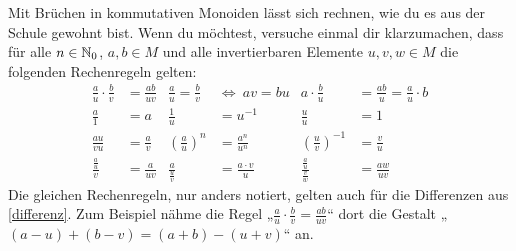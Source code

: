\begin{bem}
    Mit Brüchen in kommutativen Monoiden lässt sich rechnen, wie du es aus der Schule gewohnt bist. Wenn du möchtest, versuche einmal dir klarzumachen, dass für alle $n\in \mathbb N_0$, $a,b\in M$ und alle invertierbaren Elemente $u,v,w\in M$ die folgenden Rechenregeln gelten:
    \begingroup
    \allowdisplaybreaks
    \begin{align*}
    \frac{a}{u}\cdot \frac{b}{v} & = \frac{ab}{uv} & \frac{a}{u}=\frac{b}{v}\ & \Leftrightarrow\ av=bu & a\cdot \frac{b}{u} & = \frac{ab}{u} = \frac{a}{u}\cdot b \\[0.5em]
    \frac{a}{1} & = a & \frac{1}{u} & = u^{-1} & \frac{u}{u} & = 1 \\[0.5em]
    \frac{au}{vu} & = \frac{a}{v} & \left(\frac{a}{u}\right)^n & = \frac{a^n}{u^n} & \left(\frac{u}{v}\right)^{-1} & = \frac{v}{u} \\[0.5em]
    \frac{\frac{a}{u}}{v} & = \frac{a}{uv} & \frac{a}{\frac{u}{v}} & = \frac{a\cdot v}{u} & \frac{\frac{a}{u}}{\frac{v}{w}} & = \frac{aw}{uv}
    \end{align*}
    \endgroup
    Die gleichen Rechenregeln, nur anders notiert, gelten auch für die Differenzen aus \cref{differenz}. Zum Beispiel nähme die Regel „$\frac{a}{u}\cdot \frac{b}{v}=\frac{ab}{uv}$“ dort die Gestalt „$(a-u)+(b-v) = (a+b)-(u+v)$“ an.
\end{bem}


